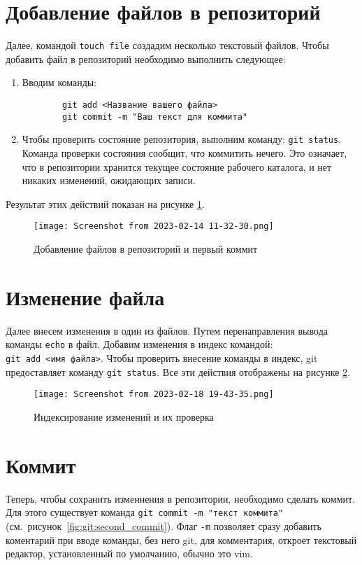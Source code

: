 \section{Добавление файлов в репозиторий}
Далее, командой \texttt{touch file} создадим несколько текстовый файлов.
Чтобы добавить файл в репозиторий необходимо выполнить следующее:
\begin{enumerate}
	\item Вводим команды:
	\begin{verbatim}
		git add <Название вашего файла>
		git commit -m "Ваш текст для коммита"
	\end{verbatim}
\item Чтобы проверить состояние репозитория,
	выполним команду: \texttt{git~status}.
	Команда проверки состояния сообщит, что коммитить нечего.
	Это означает, что в репозитории хранится текущее состояние
	рабочего каталога, и нет никаких изменений, ожидающих записи.
\end{enumerate}
Результат этих действий показан на рисунке \ref{fig:git:first_commit}.
\begin{figure}[h!tp]
	\centering
	\texttt{[image: Screenshot from 2023-02-14 11-32-30.png]}
	\caption{Добавление файлов в репозиторий и первый коммит}
	\label{fig:git:first_commit}
\end{figure}

\section{Изменение файла}

Далее внесем изменения в один из файлов. Путем перенаправления вывода команды
\texttt{echo} в файл. Добавим изменения в индекс командой:
\texttt{git~add~<имя~файла>}. Чтобы проверить внесение команды в индекс,
git предоставляет команду \texttt{git~status}. Все эти действия отображены
на рисунке \ref{fig:git:changes}.

\begin{figure}[h!tp]
	\centering
	\texttt{[image: Screenshot from 2023-02-18 19-43-35.png]}
	\caption{Индексирование изменений и их проверка}
	\label{fig:git:changes}
\end{figure}

\section{Коммит}

Теперь, чтобы сохранить изменнения в репозитории, необходимо сделать коммит.
Для этого существует команда \texttt{git~commit~-m~"текст~коммита"}
(см.~рисунок~\ref{fig:git:second_commit}).
Флаг \texttt{-m} позволяет сразу добавить коментарий при вводе команды, без
него git, для комментария, откроет текстовый редактор,
установленный по умолчанию, обычно это vim.

